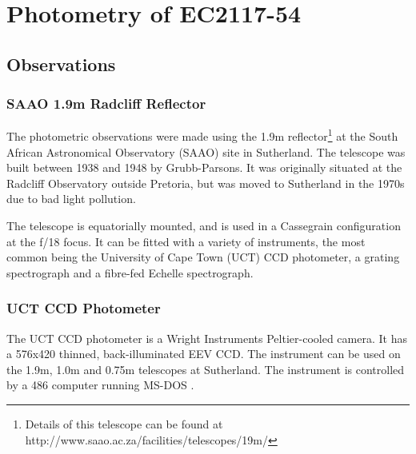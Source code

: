 \chapter{Photometry of EC2117-54}


\section{Observations}
\label{ch_photometry}

% 

\subsection{SAAO 1.9m Radcliff Reflector}

\label{saao1.9}

The photometric observations were made using the 1.9m reflector\footnote{Details of this telescope can be found at http://www.saao.ac.za/facilities/telescopes/19m/} at the South African Astronomical Observatory (SAAO) site in Sutherland. The telescope was built between 1938 and 1948 by Grubb-Parsons. It was originally situated at the Radcliff Observatory outside Pretoria, but was moved to Sutherland in the 1970s due to bad light pollution.

The telescope is equatorially mounted, and is used in a Cassegrain configuration at the f/18 focus. It can be fitted with a variety of instruments, the most common being the University of Cape Town (UCT) CCD photometer, a grating spectrograph and a fibre-fed Echelle spectrograph.



\subsection{UCT CCD Photometer}
\label{uctccd}

The UCT CCD photometer is a Wright Instruments Peltier-cooled camera. It has a 576x420 thinned, back-illuminated EEV CCD. The instrument can be used on the 1.9m, 1.0m and 0.75m telescopes at Sutherland. The instrument is controlled by a 486 computer running MS-DOS \citep{UCTCCD}.

